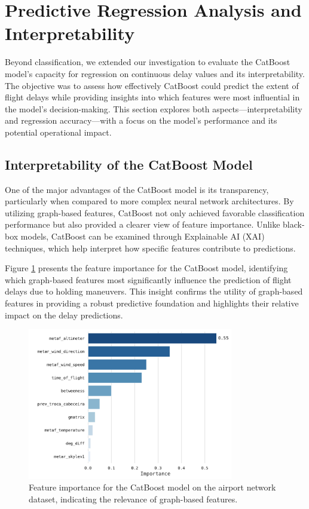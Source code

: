 \section{Predictive Regression Analysis and Interpretability}

Beyond classification, we extended our investigation to evaluate the
CatBoost model's capacity for regression on continuous delay values
and its interpretability. The objective was to assess how effectively
CatBoost could predict the extent of flight delays while providing
insights into which features were most influential in the model's
decision-making. This section explores both aspects—interpretability
and regression accuracy—with a focus on the model’s performance and
its potential operational impact.

\subsection{Interpretability of the CatBoost Model}

One of the major advantages of the CatBoost model is its transparency,
particularly when compared to more complex neural network
architectures. By utilizing graph-based features, CatBoost not only
achieved favorable classification performance but also provided a
clearer view of feature importance. Unlike black-box models, CatBoost
can be examined through Explainable AI (XAI) techniques, which help
interpret how specific features contribute to predictions.

Figure \ref{fig:catboost_feature_importance} presents the feature
importance for the CatBoost model, identifying which graph-based
features most significantly influence the prediction of flight delays
due to holding maneuvers. This insight confirms the utility of
graph-based features in providing a robust predictive foundation and
highlights their relative impact on the delay predictions.

\begin{figure}[!htbp]
    \centering
    \includegraphics[width=0.8\textwidth]{img/feature_importance_plot.pdf}
    \caption{Feature importance for the CatBoost model on the airport
    network dataset, indicating the relevance of graph-based
    features.}
    \label{fig:catboost_feature_importance}
\end{figure}

